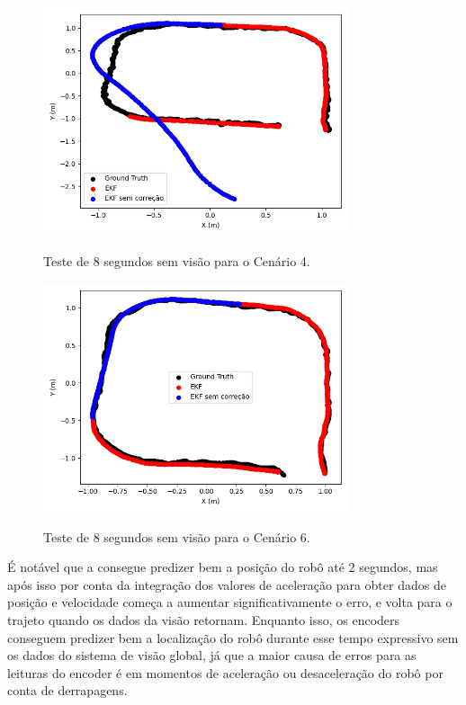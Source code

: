 \documentclass[acronym, symbols, table]{fei}
\begin{document}
		\begin{figure}[!htb]
			\centering
			\caption{Teste de 8 segundos sem visão para o Cenário 4.}
			\includegraphics[width=0.8\textwidth]{teste_imu_8s.png}
			\label{fig:teste_imu_8s}
		\end{figure}
		
		\begin{figure}[!htb]
			\centering
			\caption{Teste de 8 segundos sem visão para o Cenário 6.}
			\includegraphics[width=0.8\textwidth]{teste_encoder_8s.png}
			\label{fig:teste_encoder_8s}
		\end{figure}
	
		É notável que a  consegue predizer bem a posição do robô até 2 segundos, mas após isso por conta da integração dos valores de aceleração para obter dados de posição e velocidade começa a aumentar significativamente o erro, e volta para o trajeto quando os dados da visão retornam. Enquanto isso, os encoders conseguem predizer bem a localização do robô durante esse tempo expressivo sem os dados do sistema de visão global, já que a maior causa de erros para as leituras do encoder é em momentos de aceleração ou desaceleração do robô por conta de derrapagens.
		
\end{document}
